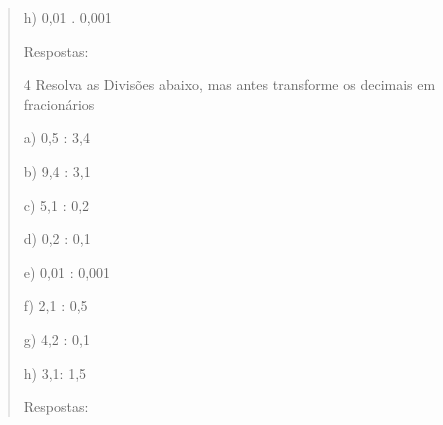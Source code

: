 \begin{quote}
h) 0,01 . 0,001


Respostas:








{4} Resolva as Divisões abaixo, mas antes transforme os decimais em
fracionários

a) 0,5 : 3,4

b) 9,4 : 3,1

c) 5,1 : 0,2

d) 0,2 : 0,1

e) 0,01 : 0,001

f) 2,1 : 0,5

g) 4,2 : 0,1

h) 3,1: 1,5


Respostas:








\end{quote}
